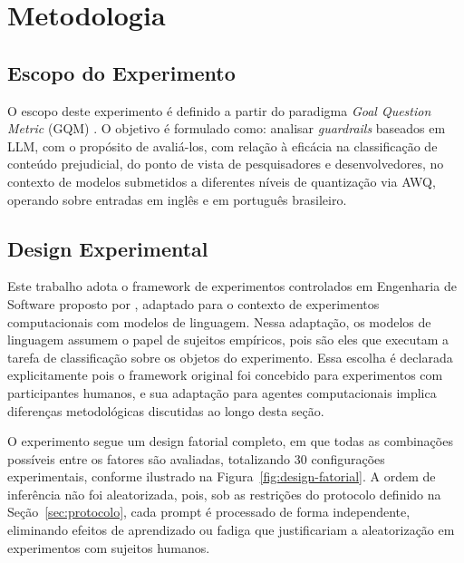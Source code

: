 \chapter{Metodologia}
\label{cap:metodologia}

\section{Escopo do Experimento}
\label{sec:escopo}

O escopo deste experimento é definido a partir do paradigma \textit{Goal Question Metric} (GQM) \cite{basili1994gqm}. O objetivo é formulado como: analisar \textit{guardrails} baseados em LLM, com o propósito de avaliá-los, com relação à eficácia na classificação de conteúdo prejudicial, do ponto de vista de pesquisadores e desenvolvedores, no contexto de modelos submetidos a diferentes níveis de quantização via AWQ, operando sobre entradas em inglês e em português brasileiro.

\section{Design Experimental}
\label{sec:design}

Este trabalho adota o framework de experimentos controlados em Engenharia de Software proposto por , adaptado para o contexto de experimentos computacionais com modelos de linguagem. Nessa adaptação, os modelos de linguagem assumem o papel de sujeitos empíricos, pois são eles que executam a tarefa de classificação sobre os objetos do experimento. Essa escolha é declarada explicitamente pois o framework original foi concebido para experimentos com participantes humanos, e sua adaptação para agentes computacionais implica diferenças metodológicas discutidas ao longo desta seção.

O experimento segue um design fatorial completo, em que todas as combinações possíveis entre os fatores são avaliadas, totalizando 30 configurações experimentais, conforme ilustrado na Figura~\ref{fig:design-fatorial}. A ordem de inferência não foi aleatorizada, pois, sob as restrições do protocolo definido na Seção~\ref{sec:protocolo}, cada prompt é processado de forma independente, eliminando efeitos de aprendizado ou fadiga que justificariam a aleatorização em experimentos com sujeitos humanos.

